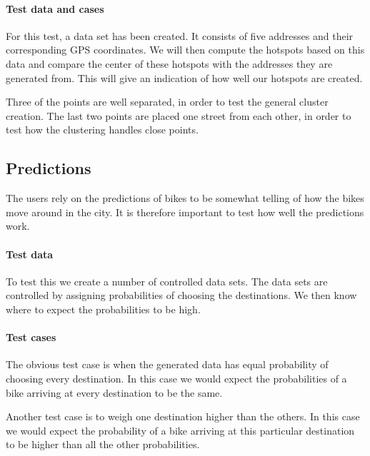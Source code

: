 \paragraph{Test data and cases}
For this test, a data set has been created.
It consists of five addresses and their corresponding GPS coordinates.
We will then compute the hotspots based on this data and compare the center of these hotspots with the addresses they are generated from.
This will give an indication of how well our hotspots are created.

Three of the points are well separated, in order to test the general cluster creation.
The last two points are placed one street from each other, in order to test how the clustering handles close points.

\subsection{Predictions}
The users rely on the predictions of bikes to be somewhat telling of how the bikes move around in the city.
It is therefore important to test how well the predictions work.

\paragraph{Test data} To test this we create a number of controlled data sets.
The data sets are controlled by assigning probabilities of choosing the destinations. 
We then know where to expect the probabilities to be high.

\paragraph{Test cases}
The obvious test case is when the generated data has equal probability of choosing every destination. 
In this case we would expect the probabilities of a bike arriving at every destination to be the same.

Another test case is to weigh one destination higher than the others.
In this case we would expect the probability of a bike arriving at this particular destination to be higher than all the other probabilities.